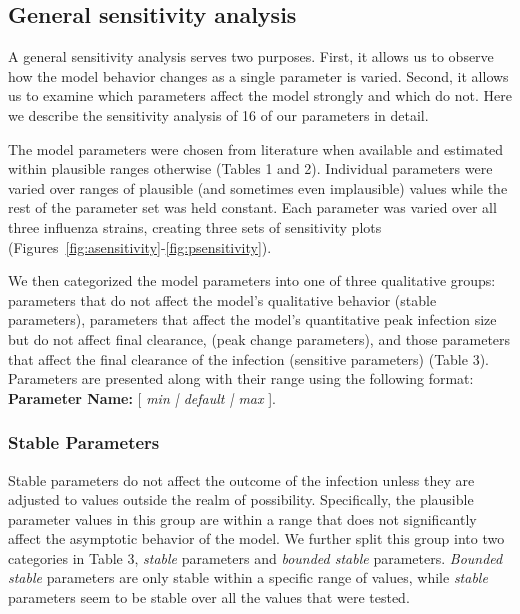 \documentclass[preprint,10pt,authoryear]{elsarticle}
\begin{document}
\subsection{General sensitivity analysis}

A general sensitivity analysis serves two purposes.  First, it allows us to observe how the model behavior changes as a single parameter is varied.  Second, it allows us to examine which parameters affect the model strongly and which do not.  Here we describe the sensitivity analysis of 16 of our parameters in detail.

The model parameters were chosen from literature when available and estimated within plausible ranges otherwise (Tables 1 and 2).  Individual parameters were varied over ranges of plausible (and sometimes even implausible) values while the rest of the parameter set was held constant.  Each parameter was varied over all three influenza strains, creating three sets of sensitivity plots (Figures~\ref{fig:asensitivity}-\ref{fig:psensitivity}).

We then categorized the model parameters into one of three qualitative groups: parameters that do not affect the model's qualitative behavior (stable parameters), parameters that affect the model's quantitative peak infection size but do not affect final clearance, (peak change parameters), and those parameters that affect the final clearance of the infection (sensitive parameters) (Table 3).  Parameters are presented along with their range using the following format:  \\

\textbf{Parameter Name:} [ \textit{min | default | max} ].


\subsubsection{Stable Parameters}

Stable parameters do not affect the outcome of the infection unless they are adjusted to values outside the realm of possibility.  Specifically, the plausible parameter values in this group are within a range that does not significantly affect the asymptotic behavior of the model.  We further split this group into two categories in Table 3, \textit{stable} parameters and \textit{bounded stable} parameters.  \textit{Bounded stable} parameters are only stable within a specific range of values, while \textit{stable} parameters seem to be stable over all the values that were tested.
\end{document}
